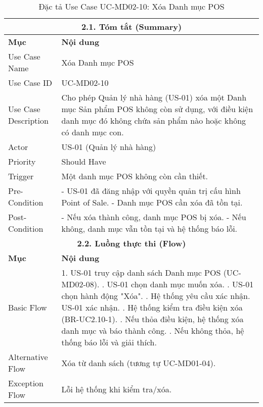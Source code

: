 \begin{longtable}{|m{4cm}|p{11cm}|}
\caption{Đặc tả Use Case UC-MD02-10: Xóa Danh mục POS} \label{tab:uc_md02_10_revised} \\
\hline
\multicolumn{2}{|c|}{\textbf{2.1. Tóm tắt (Summary)}} \\
\hline
\textbf{Mục} & \textbf{Nội dung} \\
\hline
\endhead %
\hline
\endfoot %
\hline
\endlastfoot %
Use Case Name & Xóa Danh mục POS \\
\hline
Use Case ID & UC-MD02-10 \\
\hline
Use Case Description & Cho phép Quản lý nhà hàng (US-01) xóa một Danh mục Sản phẩm POS không còn sử dụng, với điều kiện danh mục đó không chứa sản phẩm nào hoặc không có danh mục con. \\
\hline
Actor & US-01 (Quản lý nhà hàng) \\
\hline
Priority & Should Have \\
\hline
Trigger & Một danh mục POS không còn cần thiết. \\
\hline
Pre-Condition & - US-01 đã đăng nhập với quyền quản trị cấu hình Point of Sale. \newline - Danh mục POS cần xóa đã tồn tại. \\
\hline
Post-Condition & - Nếu xóa thành công, danh mục POS bị xóa. \newline - Nếu không, danh mục vẫn tồn tại và hệ thống báo lỗi. \\
\hline
\multicolumn{2}{|c|}{\textbf{2.2. Luồng thực thi (Flow)}} \\
\hline
\textbf{Mục} & \textbf{Nội dung} \\
\hline
Basic Flow & 1. US-01 truy cập danh sách Danh mục POS (UC-MD02-08). \newline 2. US-01 chọn danh mục muốn xóa. \newline 3. US-01 chọn hành động "Xóa". \newline 4. Hệ thống yêu cầu xác nhận. US-01 xác nhận. \newline 5. Hệ thống kiểm tra điều kiện xóa (BR-UC2.10-1). \newline 6. Nếu thỏa điều kiện, hệ thống xóa danh mục và báo thành công. \newline 7. Nếu không thỏa, hệ thống báo lỗi và giải thích. \\
\hline
Alternative Flow & Xóa từ danh sách (tương tự UC-MD01-04). \\
\hline
Exception Flow & Lỗi hệ thống khi kiểm tra/xóa. \\

\end{longtable}
